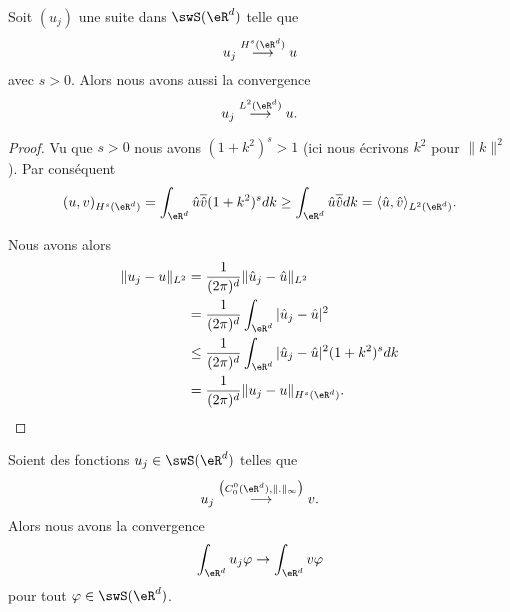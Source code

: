 \begin{lemma}       \label{LEMooZIBIooANHyPy}
    Soit \( (u_j)\) une suite dans \( \swS(\eR^d)\) telle que
    \begin{equation}
        u_j\stackrel{H^s(\eR^d)}{\longrightarrow}u
    \end{equation}
    avec \( s>0\). Alors nous avons aussi la convergence
    \begin{equation}
        u_j\stackrel{L^2(\eR^d)}{\longrightarrow}u.
    \end{equation}
\end{lemma}

\begin{proof}
    Vu que \( s>0\) nous avons \( (1+k^2)^s>1\) (ici nous écrivons \( k^2\) pour \( \| k \|^2\)). Par conséquent
    \begin{equation}
        (u,v)_{H^s(\eR^d)}=\int_{\eR^d}\hat u\overline{ \hat v }(1+k^2)^sdk\geq \int_{\eR^d}\hat u\overline{ \hat v }dk=\langle \hat u, \hat v\rangle_{L^2(\eR^d)}.
    \end{equation}
    
    Nous avons alors
    \begin{subequations}
        \begin{align}
            \| u_j-u \|_{L^2}&=\frac{1}{ (2\pi)^d }\| \hat u_j-\hat u \|_{L^2}\\
            &=\frac{1}{ (2\pi)^d }\int_{\eR^d}| \hat u_j-\hat u |^2\\
            &\leq \frac{1}{(2\pi)^d}\int_{\eR^d}| \hat u_j-\hat u |^2(1+k^2)^sdk\\
            &=\frac{1}{ (2\pi)^d }\| u_j-u \|_{H^s(\eR^d)}.
        \end{align}
    \end{subequations}
\end{proof}

\begin{lemma}       \label{LEMooGDTXooJRudME}
    Soient des fonctions \(u_j\in\swS(\eR^d) \) telles que
    \begin{equation}
        u_j\stackrel{\big( C_0^0(\eR^d),\| . \|_{\infty} \big)}{\longrightarrow}v.
    \end{equation}
    Alors nous avons la convergence
    \begin{equation}
        \int_{\eR^d}u_j\varphi\to\int_{\eR^d}v\varphi
    \end{equation}
    pour tout \( \varphi\in\swS(\eR^d)\).
\end{lemma}

